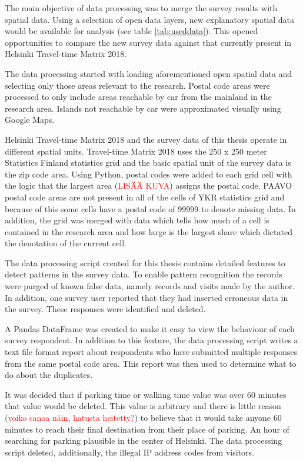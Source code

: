 The main objective of data processing was to merge the survey results with spatial data. Using a selection of open data layers, new explanatory spatial data would be available for analysis (see table \ref{tab:useddata}). This opened opportunities to compare the new survey data against that currently present in Helsinki Travel-time Matrix 2018.

The data processing started with loading aforementioned open spatial data and selecting only those areas relevant to the research. Postal code areas were processed to only include areas reachable by car from the mainland in the research area. Islands not reachable by car were approximated visually using Google Maps.

Helsinki Travel-time Matrix 2018 and the survey data of this thesis operate in different spatial units. Travel-time Matrix 2018 uses the 250 x 250 meter Statistics Finland statistics grid and the basic spatial unit of the survey data is the zip code area. Using Python, postal codes were added to each grid cell with the logic that the largest area (\textcolor{red}{LISÄÄ KUVA}) assigns the postal code. PAAVO postal code areas are not present in all of the cells of YKR statistics grid and because of this some cells have a postal code of 99999 to denote missing data. In addition, the grid was merged with data which tells how much of a cell is contained in the research area and how large is the largest share which dictated the denotation of the current cell.

The data processing script created for this thesis contains detailed features to detect patterns in the survey data. To enable pattern recognition the records were purged of known false data, namely records and visits made by the author. In addition, one survey user reported that they had inserted erroneous data in the survey. These responses were identified and deleted.

A Pandas DataFrame was created to make it easy to view the behaviour of each survey respondent. In addition to this feature, the data processing script writes a text file format report about respondents who have submitted multiple responses from the same postal code area. This report was then used to determine what to do about the duplicates.

It was decided that if parking time or walking time value was over 60 minutes that value would be deleted. This value is arbitrary and there is little reason (\textcolor{red}{voiko sanoa näin, hatusta heitetty?}) to believe that it would take anyone 60 minutes to reach their final destination from their place of parking. An hour of searching for parking plausible in the center of Helsinki. The data processing script deleted, additionally, the illegal IP address codes from visitors.

